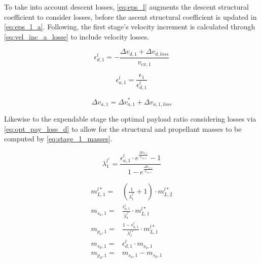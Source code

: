 To take into account descent losses, \autoref{eq:eps_l} augments the descent structural coefficient to consider losses, before the ascent structural coefficient is updated in \autoref{eq:eps_l_a}. Following, the first stage's velocity increment is calculated through \autoref{eq:vel_inc_a_losse} to include velocity losses.

\begin{equation}
    \epsilon_{d,1}^l = - \frac{\Delta v_{d,1} + \Delta v_{d,loss}}{v_{ex,1}}
\label{eq:eps_l}
\end{equation}

\begin{equation}
    \epsilon_{a,1}^l = \frac{\epsilon_1}{\epsilon_{d,1}^l}
\label{eq:eps_l_a}
\end{equation}

\begin{equation}
    \Delta v_{a,1} = \Delta v_{a,1}^* + \Delta v_{a,1,loss}
\label{eq:vel_inc_a_losse}
\end{equation}

Likewise to the expendable stage the optimal payload ratio considering losses via \autoref{eq:opt_pay_loss_d} to allow for the structural and propellant masses to be computed by \autoref{eq:stage_1_masses}.

\begin{equation}
    \lambda_1^{l^*} = \frac{\epsilon_{a,1}^l \cdot e^{\frac{\Delta v_{a,1}}{v_{ex,1}}} - 1}{1 - e^{\frac{\Delta v_{a,1}}{v_{ex,1}}}}
\label{eq:opt_pay_loss_d}
\end{equation}

\begin{equation}
\begin{aligned}
    m_{L,1}^{l*} =& (\frac{1}{\lambda_1^{l^*}} + 1) \cdot m_{L,2}^{l*} \\
    m_{s_a,1} =& \frac{\epsilon_{a,1}^l}{\lambda_1^{l^*}} \cdot m_{L,1}^{l*} \\
    m_{p_a,1} =& \frac{1-\epsilon_{a,1}^l}{\lambda_1^{l*}} \cdot m_{L,1}^{l*} \\
    m_{s_d,1} =& \epsilon_{d,1}^l \cdot m_{s_a,1} \\
    m_{p_d,1} =& m_{s_a,1} - m_{s_d,1}
\end{aligned}
\label{eq:stage_1_masses}
\end{equation}